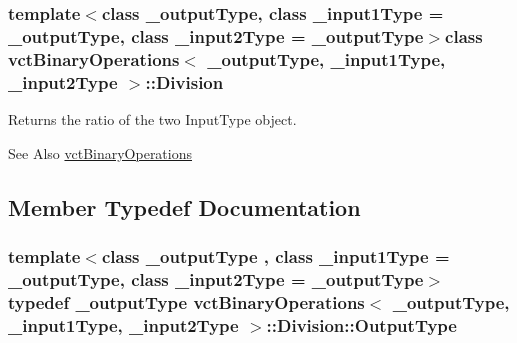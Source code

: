 \subsubsection*{template$<$class \-\_\-output\-Type, class \-\_\-input1\-Type = \-\_\-output\-Type, class \-\_\-input2\-Type = \-\_\-output\-Type$>$class vct\-Binary\-Operations$<$ \-\_\-output\-Type, \-\_\-input1\-Type, \-\_\-input2\-Type $>$\-::\-Division}

Returns the ratio of the two Input\-Type object. 

\begin{DoxySeeAlso}{See Also}
\hyperlink{classvct_binary_operations}{vct\-Binary\-Operations} 
\end{DoxySeeAlso}


\subsection{Member Typedef Documentation}
\hypertarget{classvct_binary_operations_1_1_division_a3e7c6d995453d18ae82265141ae1dff0}{
\subsubsection[{Output\-Type}]{\setlength{\rightskip}{0pt plus 5cm}template$<$class \-\_\-output\-Type , class \-\_\-input1\-Type  = \-\_\-output\-Type, class \-\_\-input2\-Type  = \-\_\-output\-Type$>$ typedef \-\_\-output\-Type {\bf vct\-Binary\-Operations}$<$ \-\_\-output\-Type, \-\_\-input1\-Type, \-\_\-input2\-Type $>$\-::{\bf Division\-::\-Output\-Type}}}\label{classvct_binary_operations_1_1_division_a3e7c6d995453d18ae82265141ae1dff0}


